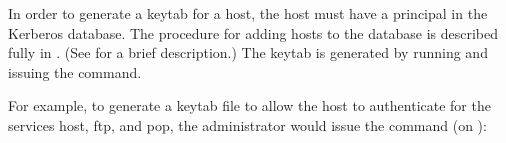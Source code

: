 \documentclass[letterpaper,10pt,english]{sphinxmanual}
\begin{document}
In order to generate a keytab for a host, the host must have a
principal in the Kerberos database.  The procedure for adding hosts to
the database is described fully in {\hyperref[\detokenize{admin/database:add-mod-del-princs}]{}}.  (See
{\hyperref[\detokenize{admin/install_kdc:replica-host-key}]{}} for a brief description.)  The keytab is
generated by running {\hyperref[\detokenize{admin/admin_commands/kadmin_local:kadmin-1}]{}} and issuing the {\hyperref[\detokenize{admin/admin_commands/kadmin_local:ktadd}]{}}
command.

For example, to generate a keytab file to allow the host
 to authenticate for the services host, ftp, and
pop, the administrator  would issue the command (on
):
\end{document}

